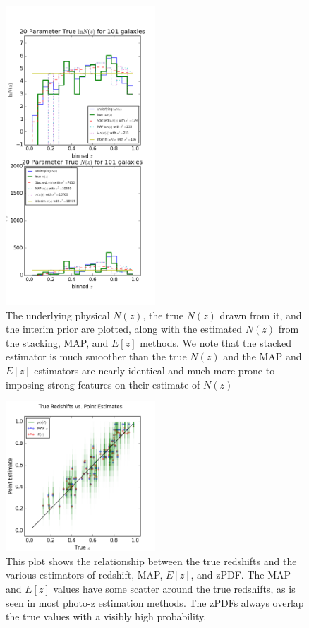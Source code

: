 \documentclass[preprint]{aastex}
\begin{document}
\begin{figure}
\includegraphics[width=0.5\textwidth]{null/trueNz.png}
\caption{The underlying physical $N(z)$, the true $N(z)$ drawn from it, and the interim prior are plotted, along with the estimated $N(z)$ from the stacking, MAP, and $E[z]$ methods.  We note that the stacked estimator is much smoother than the true $N(z)$ and the MAP and $E[z]$ estimators are nearly identical and much more prone to imposing strong features on their estimate of $N(z)$}
\label{fig:nulltrueNz}
\end{figure}

\begin{figure}
\includegraphics[width=0.5\textwidth]{null/truevmap.png}
\caption{This plot shows the relationship between the true redshifts and the various estimators of redshift, MAP, $E[z]$, and zPDF.  The MAP and $E[z]$ values have some scatter around the true redshifts, as is seen in most photo-z estimation methods.  The zPDFs always overlap the true values with a visibly high probability.}
\label{fig:nullcat}
\end{figure}
\end{document}
